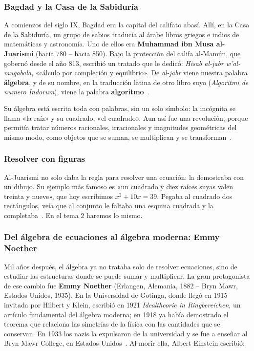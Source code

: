 \documentclass[11pt]{article}
\begin{document}
\subsubsection*{Bagdad y la Casa de la Sabiduría}

A comienzos del siglo IX, Bagdad era la capital del califato abasí. Allí, en
la Casa de la Sabiduría, un grupo de sabios traducía al árabe libros griegos e
indios de matemáticas y astronomía. Uno de ellos era \textbf{Muhammad ibn
Musa al-Juarismi} (hacia 780 – hacia 850). Bajo la protección del califa
al-Mamún, que gobernó desde el año 813, escribió un tratado que le dedicó:
\emph{Hisab al-jabr w'al-muqabala}, «cálculo por compleción y
equilibrio». De \emph{al-jabr} viene nuestra palabra \textbf{álgebra}, y de
su nombre, en la traducción latina de otro libro suyo (\emph{Algoritmi de
numero Indorum}), viene la palabra \textbf{algoritmo}~\cite{mactutorjuarismi}.

Su álgebra está escrita toda con palabras, sin un solo símbolo: la incógnita
se llama «la raíz» y su cuadrado, «el cuadrado». Aun así fue una revolución,
porque permitía tratar números racionales, irracionales y magnitudes
geométricas del mismo modo, como objetos que se suman, se multiplican y se
transforman~\cite{mactutorarabe}.

\subsubsection*{Resolver con figuras}

Al-Juarismi no solo daba la regla para resolver una ecuación: la demostraba
con un dibujo. Su ejemplo más famoso es «un cuadrado y diez raíces suyas
valen treinta y nueve», que hoy escribimos $x^2 + 10x = 39$. Pegaba al
cuadrado dos rectángulos, veía que al conjunto le faltaba una esquina
cuadrada y la completaba~\cite{rosen}. En el tema 2 haremos lo mismo.

\subsubsection*{Del álgebra de ecuaciones al álgebra moderna: Emmy Noether}

Mil años después, el álgebra ya no trataba solo de resolver ecuaciones, sino
de estudiar las estructuras donde se puede sumar y multiplicar. La gran
protagonista de ese cambio fue \textbf{Emmy Noether} (Erlangen, Alemania,
1882 – Bryn Mawr, Estados Unidos, 1935). En la Universidad de Gotinga, donde
llegó en 1915 invitada por Hilbert y Klein, escribió en 1921
\emph{Idealtheorie in Ringbereichen}, un artículo fundamental del álgebra
moderna; en 1918 ya había demostrado el teorema que relaciona las simetrías
de la física con las cantidades que se conservan. En 1933 los nazis la
expulsaron de la universidad y se fue a enseñar al Bryn Mawr College, en
Estados Unidos~\cite{mactutornoether}. Al morir ella, Albert Einstein
escribió:
\end{document}
